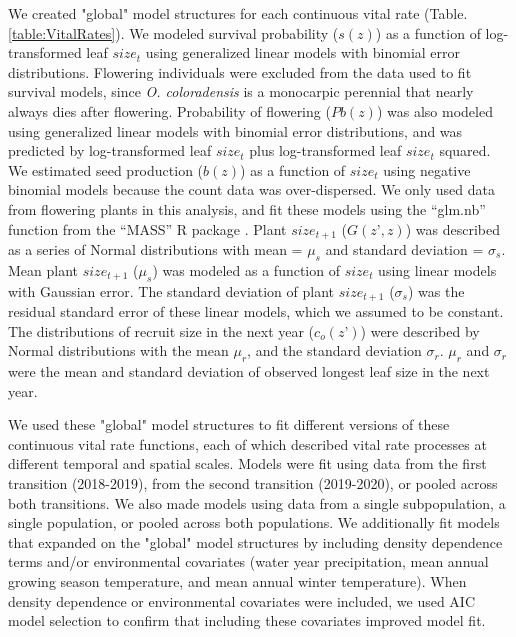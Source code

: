 \documentclass[12pt, letterpaper]{article}
\begin{document}
We created "global" model structures for each continuous vital rate (Table. \ref{table:VitalRates}). We modeled survival probability ($s(z)$) as a function of log-transformed leaf $size_t$ using generalized linear models with binomial error distributions. Flowering individuals were excluded from the data used to fit survival models, since \textit{O. coloradensis} is a monocarpic perennial that nearly always dies after flowering. Probability of flowering ($Pb(z)$) was also modeled using generalized linear models with binomial error distributions, and was predicted by log-transformed leaf $size_t$ plus log-transformed leaf $size_t$ squared. We estimated seed production ($b(z)$) as a function of $size_t$ using negative binomial models because the count data was over-dispersed. We only used data from flowering plants in this analysis, and fit these models using the “glm.nb” function from the “MASS” R package \cite{Venables2002ModernS}. Plant $size_{t+1}$ ($G(z’,z)$) was described as a series of Normal distributions with mean = $\mu_s$ and standard deviation = $\sigma_s$. Mean plant $size_{t+1}$ ($\mu_s$) was modeled as a function of $size_t$ using linear models with Gaussian error. The standard deviation of plant $size_{t+1}$ ($\sigma_s$) was the residual standard error of these linear models, which we assumed to be constant. The distributions of recruit size in the next year ($c_o(z’)$) were described by Normal distributions with the mean $\mu_r$, and the standard deviation $\sigma_r$. $\mu_r$ and $\sigma_r$ were the mean and standard deviation of observed longest leaf size in the next year.

We used these "global" model structures to fit different versions of these continuous vital rate functions, each of which described vital rate processes at different temporal and spatial scales. Models were fit using data from the first transition (2018-2019), from the second transition (2019-2020), or pooled across both transitions. We also made models using data from a single subpopulation, a single population, or pooled across both populations. We additionally fit models that expanded on the "global" model structures by including density dependence terms and/or environmental covariates (water year precipitation, mean annual growing season temperature, and mean annual winter temperature). When density dependence or environmental covariates were included, we used AIC model selection to confirm that including these covariates improved model fit.   
\end{document}

